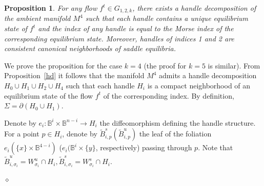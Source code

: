 \documentclass[%
 aip,
 amsmath,amssymb,
preprint,%
]{revtex4-1}
\newtheorem{propos}{Proposition}
\newenvironment{proof}{{\bf Proof:}}
{\hfill $\diamond$\medskip}
\begin{document}
\begin{propos}\label{Step1} For any flow $f^t\in G_{1,2,k}$, there exists a handle decomposition  of the ambient  manifold $M^4$ such that each handle contains a unique equilibrium state of  $f^t$ and the index of any  handle  is equal to the Morse index of the corresponding equilibrium state. Moreover,
handles of indices 1 and 2 are consistent canonical neighborhoods of saddle equilibria.
\end{propos}
\begin{proof}
We prove the proposition for the case $k=4$ (the proof for $k=5$ is similar).
From Proposition~\ref{hd} it follows that the manifold $M^4$ admits a handle decomposition $H_0\cup H_1\cup H_2\cup H_4$ such that each handle $H_i$ is a compact neighborhood of an equilibrium state of the flow $f^t$ of the corresponding index. By definition, $\Sigma=\partial (H_0\cup H_1)$.

Denote by $e_i: \mathbb B^i\times \mathbb B^{n-i}\to H_i$ the diffeomorphism defining the handle structure. For a point $p\in H_i$, denote by $\widetilde B^s_{i,p} ( \widetilde B^u_{i,p})$ the leaf of the foliation $e_i(\{x\}\times \mathbb B^{4-i})$  ($e_i(\mathbb B^{i}\times \{y\}$, respectively) passing through $p$. {Note that $\widetilde B^u_{i,\sigma_i}=W^u_{\sigma_i}\cap H_i, \widetilde B^s_{i,\sigma_i}=W^s_{\sigma_i}\cap H_i$}.


\end{proof}
\end{document}
